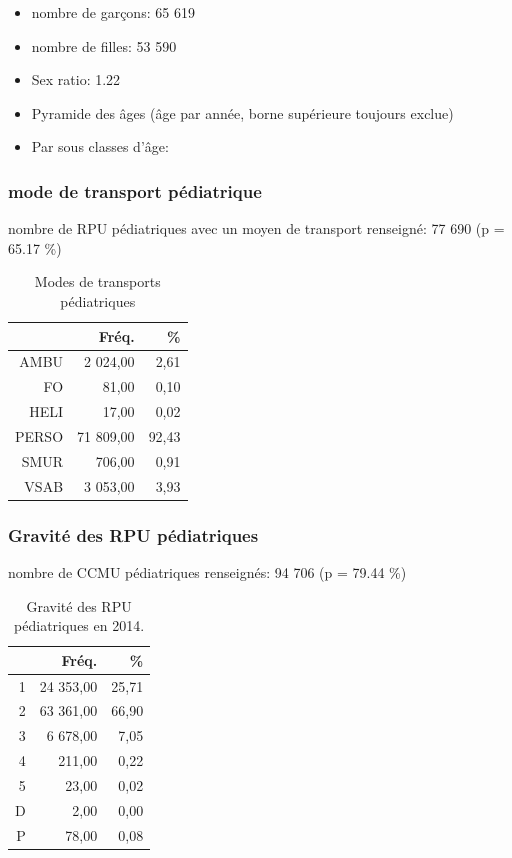 \documentclass[]{article}
\begin{document}
\begin{itemize}
\itemsep1pt\parskip0pt
\item
  nombre de garçons: 65 619
\item
  nombre de filles: 53 590
\item
  Sex ratio: 1.22
\item
  Pyramide des âges (âge par année, borne supérieure toujours exclue)
\item
  Par sous classes d'âge:
\end{itemize}

\subsubsection{mode de transport
pédiatrique}\label{mode-de-transport-pediatrique}

nombre de RPU pédiatriques avec un moyen de transport renseigné: 77 690
(p = 65.17 \%)

\begin{table}[ht]
\centering
\begin{tabular}{rrr}
  \hline
 & Fréq. & \% \\ 
  \hline
AMBU & 2 024,00 & 2,61 \\ 
  FO & 81,00 & 0,10 \\ 
  HELI & 17,00 & 0,02 \\ 
  PERSO & 71 809,00 & 92,43 \\ 
  SMUR & 706,00 & 0,91 \\ 
  VSAB & 3 053,00 & 3,93 \\ 
   \hline
\end{tabular}
\caption{Modes de transports pédiatriques} 
\end{table}

\subsubsection{Gravité des RPU
pédiatriques}\label{gravite-des-rpu-pediatriques}

nombre de CCMU pédiatriques renseignés: 94 706 (p = 79.44 \%)

\begin{table}[ht]
\centering
\begin{tabular}{rrr}
  \hline
 & Fréq. & \% \\ 
  \hline
1 & 24 353,00 & 25,71 \\ 
  2 & 63 361,00 & 66,90 \\ 
  3 & 6 678,00 & 7,05 \\ 
  4 & 211,00 & 0,22 \\ 
  5 & 23,00 & 0,02 \\ 
  D & 2,00 & 0,00 \\ 
  P & 78,00 & 0,08 \\ 
   \hline
\end{tabular}
\caption{Gravité des RPU pédiatriques en 2014.} 
\end{table}
\end{document}
